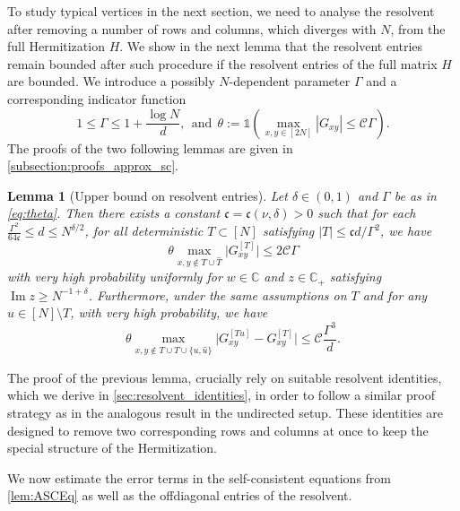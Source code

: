\documentclass[10pt,a4paper]{amsart}
\DeclareMathOperator{\Ima}{Im}
\newcommand{\abs}[1]{\left| #1 \right|}
\newcommand{\absb}[1]{\bigl| #1 \bigr|}
\newcommand{\C}{\mathbb{C}}
\renewcommand{\Im}{\Ima}
\newtheorem{lemma}{Lemma}[section]
\numberwithin{equation}{section}
\newcommand*\bset[1]{[#1]}
\newcommand*\ubarr[1]{{\widehat{#1}}}
\begin{document}
	To study typical vertices in the next section, we need to analyse the resolvent after removing a number of rows and columns, which diverges with $N$, from the full Hermitization $H$.
	We show in the next lemma that the resolvent entries remain bounded after such procedure if the resolvent entries of the full matrix $H$ are bounded. 	
	We introduce a possibly $N$-dependent parameter $ \Gamma $ and a corresponding indicator function
	\begin{equation}\label{eq:theta}
		1\le \Gamma \le 1 + \frac{\log N}{d}, ~~\text{and} ~~\theta := \mathds{1}\left(\max_{x,y\in [2N]} \abs{G_{xy}}\le \mathcal C \Gamma\right) .
	\end{equation}
The proofs of the two following lemmas are given in \cref{subsection:proofs_approx_sc}.
	\begin{lemma}[Upper bound on resolvent entries] \label{lem:roughboundsGT}
	 Let $\delta \in (0,1)$ and $\Gamma$ be as in \cref{eq:theta}. 
		Then there exists a constant $\mathfrak{c}= \mathfrak{c}(\nu,\delta) >0$ such that for each $ \frac{\Gamma^2}{64 \mathfrak c} \leq d \leq N^{\delta/2}$, for all deterministic $T\subset [N]$ satisfying $\abs{T} \le \mathfrak{c}d / \Gamma^2$, we have 
		\begin{equation}\label{eq:boundGTGTu}
			\theta \max_{x,y \notin T \cup \ubarr{T}} \absb{G^{\bset{T}}_{xy}} \le 2  \mathcal C  \Gamma
		\end{equation}
		with very high probability uniformly for $w \in \C$ and $z \in \C_+$ satisfying $\Im z \geq N^{-1+\delta}$. 
		Furthermore, under the same assumptions on $T$ and for any $u \in [N] \setminus T$, with very high probability,  we have 
		\begin{equation}\label{eq:GTandGTuclose}
			\theta \max_{x,y \notin T \cup \ubarr{T} \cup \{ u, \ubarr{u}\}} \absb{G_{xy}^{\bset{Tu}} - G_{xy}^{\bset{T}}} \le \mathcal{C} \frac{\Gamma^{3}}{d}.
		\end{equation}
	\end{lemma}
	 
The proof of the previous lemma, crucially rely on suitable resolvent identities, which we derive in \cref{sec:resolvent_identities}, in order to follow a similar proof strategy as in the analogous result \cite[Lemma~4.14]{alt2021delocalization} in the undirected setup. These identities are designed to remove two corresponding 
	rows and columns at once to keep the special structure of the Hermitization.  
	

	
	We now estimate the error terms in the self-consistent equations from \cref{lem:ASCEq}
	as well as the offdiagonal entries of the resolvent. 
\end{document}

